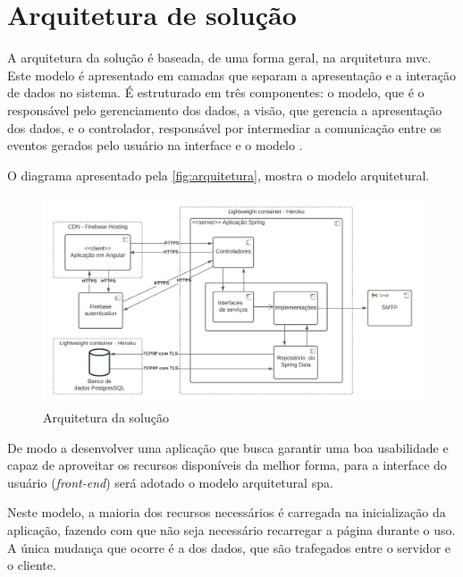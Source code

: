 \section{Arquitetura de solução}

A arquitetura da solução é baseada, de uma forma geral, na arquitetura \ac{mvc}. Este modelo é apresentado em camadas que separam a apresentação e a interação de dados no sistema. É estruturado em três componentes: o modelo, que é o responsável pelo gerenciamento dos dados, a visão, que gerencia a apresentação dos dados, e o controlador, responsável por intermediar a comunicação entre os eventos gerados pelo usuário na interface e o modelo \cite{engenharia-de-software:2018}.

O diagrama apresentado pela \autoref{fig:arquitetura}, mostra o modelo arquitetural.

\begin{figure}[htb]
    \centering
	\includegraphics[width=16cm]{imagens/Arquitetura.jpg}
	\caption{\label{fig:arquitetura} Arquitetura da solução}
\end{figure}
 
 
De modo a desenvolver uma aplicação que busca garantir uma boa usabilidade e capaz de aproveitar os recursos disponíveis da melhor forma, para a interface do usuário (\textit{\gls{front-end}}) será adotado o modelo arquitetural \ac{spa}. 


Neste modelo, a maioria dos recursos necessários é carregada na inicialização da aplicação, fazendo com que não seja necessário recarregar a página durante o uso. A única mudança que ocorre é a dos dados, que são trafegados entre o servidor e o cliente.


